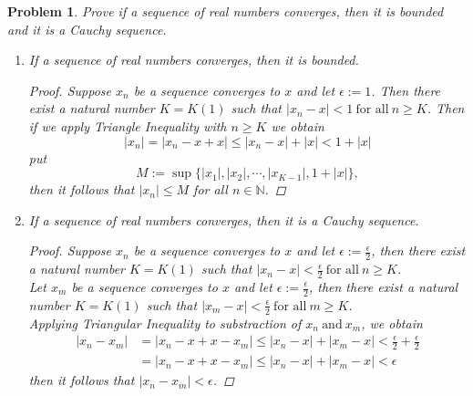 \documentclass[a4paper,12pt]{article}
\newtheorem{prob}{Problem}[]
\newcommand{\N}{\mathbb{N}}
\begin{document}
\begin{prob}
	Prove if a sequence of real numbers converges, then it is bounded and it is a Cauchy sequence.
	\begin{enumerate}
		\item If a sequence of real numbers converges, then it is bounded.
		\begin{proof}
			Suppose $x_n$ be a sequence converges to $x$ and let $\epsilon:=1$. Then there exist a natural number $K=K(1)$ such that $|x_n-x|<1\ \text{for all}\ n\geq K$. Then if we apply Triangle Inequality with $n\geq K$ we obtain
			\begin{equation*}
			|x_n|=|x_n-x+x|\leq|x_n-x|+|x|<1+|x|
			\end{equation*}
			put
			\begin{equation*}
			M:=\sup\{|x_1|,|x_2|,\cdots,|x_{K-1}|,1+|x|\},
			\end{equation*}
			then it follows that $|x_n|\leq M$ for all $n\in \N$.
		\end{proof}
	\newpage
		\item If a sequence of real numbers converges, then it is a Cauchy sequence.
		\begin{proof}
			Suppose $x_n$ be a sequence converges to $x$ and let $\epsilon:=\frac{\epsilon}{2}$, then there exist a natural number $K=K(1)$ such that $|x_n-x|<\frac{\epsilon}{2}\ \text{for all}\ n\geq K$.\\
			Let $x_m$ be a sequence converges to $x$ and let $\epsilon:=\frac{\epsilon}{2}$, then there exist a natural number $K=K(1)$ such that $|x_m-x|<\frac{\epsilon}{2}\ \text{for all}\ m\geq K$.\\
			Applying Triangular Inequality to substraction of $x_n\ \text{and}\ x_m$, we obtain
			\begin{equation*}
			\begin{aligned}
			|x_n - x_m|&=|x_n-x+x-x_m|\leq|x_n-x|+|x_m-x| < \frac{\epsilon}{2}+\frac{\epsilon}{2}\\
			&=|x_n-x+x-x_m|\leq|x_n-x|+|x_m-x| < \epsilon
			\end{aligned}
			\end{equation*}
			then it follows that $|x_n - x_m|<\epsilon$.
		\end{proof}
	\end{enumerate}
\end{prob}
\end{document}
